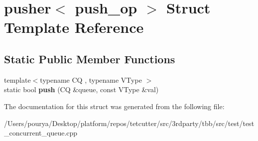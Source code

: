 \hypertarget{structpusher}{}\section{pusher$<$ push\+\_\+op $>$ Struct Template Reference}
\label{structpusher}
\subsection*{Static Public Member Functions}
\begin{DoxyCompactItemize}
\item 
\hypertarget{structpusher_a425ef9c25db81425e1f91f672ed42f3b}{}{\footnotesize template$<$typename C\+Q , typename V\+Type $>$ }\\static bool {\bfseries push} (C\+Q \&queue, const V\+Type \&val)\label{structpusher_a425ef9c25db81425e1f91f672ed42f3b}

\end{DoxyCompactItemize}


The documentation for this struct was generated from the following file\+:\begin{DoxyCompactItemize}
\item 
/\+Users/pourya/\+Desktop/platform/repos/tetcutter/src/3rdparty/tbb/src/test/test\+\_\+concurrent\+\_\+queue.\+cpp\end{DoxyCompactItemize}
